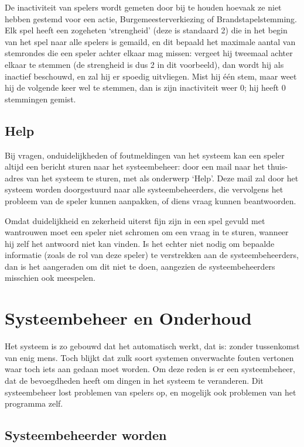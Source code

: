 \documentclass[12pt]{article}
\begin{document}
    De inactiviteit van spelers wordt gemeten door bij te houden hoevaak ze niet hebben gestemd voor een actie, Burgemeesterverkiezing of Brandstapelstemming. Elk spel heeft een zogeheten `strengheid' (deze is standaard 2) die in het begin van het spel naar alle spelers is gemaild, en dit bepaald het maximale aantal van stemrondes die een speler achter elkaar mag missen: vergeet hij tweemaal achter elkaar te stemmen (de strengheid is dus 2 in dit voorbeeld), dan wordt hij als inactief beschouwd, en zal hij er spoedig uitvliegen. Mist hij \'e\'en stem, maar weet hij de volgende keer wel te stemmen, dan is zijn inactiviteit weer 0; hij heeft 0 stemmingen gemist.

  \subsection{Help} \label{subsec:help}
  
    Bij vragen, onduidelijkheden of foutmeldingen van het systeem kan een speler altijd een bericht sturen naar het systeembeheer: door een mail naar het thuis-adres van het systeem te sturen, met als onderwerp `Help'. Deze mail zal door het systeem worden doorgestuurd naar alle systeembeheerders, die vervolgens het probleem van de speler kunnen aanpakken, of diens vraag kunnen beantwoorden. 
  
    Omdat duidelijkheid en zekerheid uiterst fijn zijn in een spel gevuld met wantrouwen moet een speler niet schromen om een vraag in te sturen, wanneer hij zelf het antwoord niet kan vinden. Is het echter niet nodig om bepaalde informatie (zoals de rol van deze speler) te verstrekken aan de systeembeheerders, dan is het aangeraden om dit niet te doen, aangezien de systeembeheerders misschien ook meespelen.

\section{Systeembeheer en Onderhoud}

  Het systeem is zo gebouwd dat het automatisch werkt, dat is: zonder tussenkomst van enig mens. Toch blijkt dat zulk soort systemen onverwachte fouten vertonen waar toch iets aan gedaan moet worden. Om deze reden is er een systeembeheer, dat de bevoegdheden heeft om dingen in het systeem te veranderen. Dit systeembeheer lost problemen van spelers op, en mogelijk ook problemen van het programma zelf.
  
  \subsection{Systeembeheerder worden}
  
\end{document}

